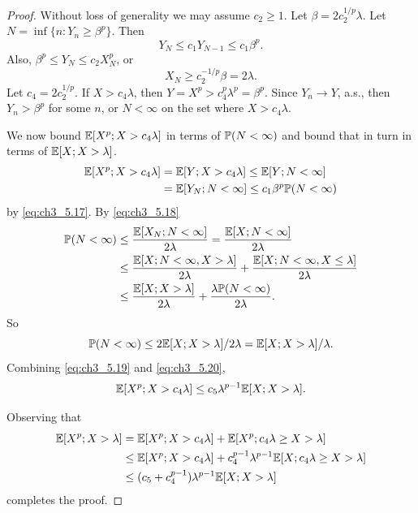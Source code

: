 \begin{proof}
Without loss of generality we may assume $c_2 \geq 1$. Let $\beta = 2c_2^{1/p}\lambda$. Let $N = \inf\{n: Y_n \geq \beta^p\}$. Then
\begin{equation}\label{eq:ch3_5.17}
    Y_N \leq c_1Y_{N-1} \leq c_1\beta^p.
\end{equation}
Also, $\beta^p \leq Y_N \leq c_2X_N^p$, or
\begin{equation}\label{eq:ch3_5.18}
    X_N \geq c_2^{-1/p}\beta = 2\lambda.
\end{equation}
Let $c_4 = 2c_2^{1/p}$. If $X > c_4\lambda$, then $Y = X^p > c_4^p\lambda^p = \beta^p$. Since $Y_n \to Y$, a.s., then $Y_n > \beta^p$ for some $n$, or $N < \infty$ on the set where $X > c_4\lambda$.

We now bound $\E[X^p; X > c_4\lambda]$ in terms of $\P(N < \infty)$ and bound that in turn in terms of $\E[X; X > \lambda]$.
\begin{align}\label{eq:ch3_5.19}
    \E[X^p; X > c_4\lambda] &= \E[Y; X > c_4\lambda] \leq \E[Y; N < \infty] \\
    &= \E[Y_N; N < \infty] \leq c_1\beta^p\P(N < \infty) \notag
\end{align}
by \eqref{eq:ch3_5.17}. By \eqref{eq:ch3_5.18}
\begin{align}\label{eq:ch3_5.20}
    \P(N < \infty) &\leq \frac{\E[X_N; N < \infty]}{2\lambda} = \frac{\E[X; N < \infty]}{2\lambda} \\
    &\leq \frac{\E[X; N < \infty, X > \lambda]}{2\lambda} + \frac{\E[X; N < \infty, X \leq \lambda]}{2\lambda} \notag \\
    &\leq \frac{\E[X; X > \lambda]}{2\lambda} + \frac{\lambda\P(N < \infty)}{2\lambda}. \notag
\end{align}
So
\[
    \P(N < \infty) \leq 2\E[X; X > \lambda]/2\lambda = \E[X; X > \lambda]/\lambda.
\]
Combining \eqref{eq:ch3_5.19} and \eqref{eq:ch3_5.20},
\[
    \E[X^p; X > c_4\lambda] \leq c_5\lambda^{p-1}\E[X; X > \lambda].
\]

Observing that
\begin{align*}
    \E[X^p; X > \lambda] &= \E[X^p; X > c_4\lambda] + \E[X^p; c_4\lambda \geq X > \lambda] \\
    &\leq \E[X^p; X > c_4\lambda] + c_4^{p-1}\lambda^{p-1}\E[X; c_4\lambda \geq X > \lambda] \\
    &\leq (c_5 + c_4^{p-1})\lambda^{p-1}\E[X; X > \lambda]
\end{align*}
completes the proof.
\end{proof}

